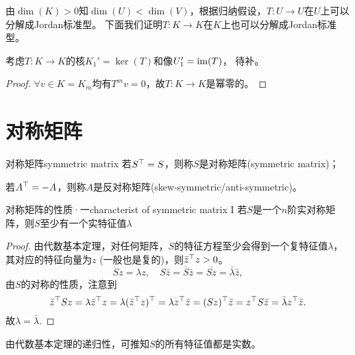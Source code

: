 \begin{corollary}
	由$\dim(K)>0$知$\dim(U)<\dim(V)$，根据归纳假设，$T:U\to U$在$U$上可以分解成Jordan标准型。
	下面我们证明$T:K\to K$在$K$上也可以分解成Jordan标准型。
\end{corollary}

\begin{theorem}
	{}{}
	考虑$T:K\to K$的核$K_1'=\ker(T)$和像$U_1'=\operatorname{im}(T)$，
	待补。
\end{theorem}

\begin{proof}
	$\forall v\in K=K_m$均有$T^mv=0$，故$T:K\to K$是幂零的。
\end{proof}

\section{对称矩阵}

\begin{definition}
	{对称矩阵}{symmetric matrix}
	若$S^\top=S$，则称$S$是对称矩阵(symmetric matrix)；
	
	若$A^\top=-A$，则称$A$是反对称矩阵(skew-symmetric/anti-symmetric)。
\end{definition}
\begin{theorem}{对称矩阵的性质·一}{characterist of symmetric matrix I}
	若$S$是一个$n$阶实对称矩阵，则$S$至少有一个实特征值$\lambda$
\end{theorem}
\begin{proof}
	由代数基本定理，对任何矩阵，$S$的特征方程至少会得到一个复特征值$\lambda$，其对应的特征向量为$z$ (一般也是复的)，则$\bar z^\top z>0$。
	\[
		Sz=\lambda z,\quad S\bar z=\bar S\bar z=\overline{Sz}=\bar\lambda\bar z,
	\]
	由$S$的对称的性质，注意到
	\[
		\bar z^\top Sz=\lambda\bar z^\top z=\lambda(\bar z^\top z)^\top=\lambda z^\top\bar z=(Sz)^\top\bar z=z^\top S\bar z=\bar\lambda z^\top\bar z.
	\]
	故$\lambda=\bar\lambda$.
\end{proof}

\begin{corollary}
	由代数基本定理的递归性，可推知$S$的所有特征值都是实数。
\end{corollary}

